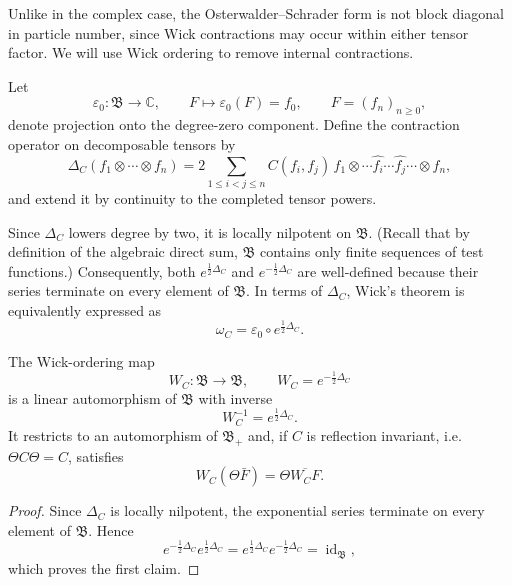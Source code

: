 \documentclass[10pt,a4paper,oneside,reqno]{amsart}
\begin{document}
\begin{appendices}
Unlike in the complex case, the Osterwalder--Schrader form is not block
diagonal in particle number, since Wick contractions may occur within
either tensor factor. We will use Wick ordering to remove internal contractions.

Let
\begin{equation}
  \varepsilon_0:\mathfrak B\longrightarrow\mathbb C,
  \qquad
  F\mapsto \varepsilon_0(F)=f_0,
  \qquad
  F=(f_n)_{n\geq0},
\end{equation}
denote projection onto the degree-zero component. Define the contraction
operator on decomposable tensors by
\begin{equation}
  \Delta_C(f_1\otimes\cdots\otimes f_n)
  =
  2\sum_{1\leq i<j\leq n}
  C(f_i,f_j)\,
  f_1\otimes\cdots
  \widehat{f_i}\cdots
  \widehat{f_j}\cdots
  \otimes f_n,
\end{equation}
and extend it by continuity to the completed tensor powers.

Since $\Delta_C$ lowers degree by two, it is locally nilpotent on
$\mathfrak B$. 
(Recall that by definition of the algebraic direct sum, $\mathfrak B$ contains only finite sequences of test functions.) 
Consequently, both $e^{\frac12\Delta_C}$ and
$e^{-\frac12\Delta_C}$ are well-defined because their series terminate on every
element of $\mathfrak B$. In terms of $\Delta_C$, Wick's theorem is
equivalently expressed as
\begin{equation}
  \omega_C
  =
  \varepsilon_0\circ e^{\frac12\Delta_C}.
\end{equation}

\begin{lemma}
\label{lem:wick-ordering}
The Wick-ordering map
\begin{equation}
  W_C\colon\mathfrak B\longrightarrow\mathfrak B,
  \qquad W_C=e^{-\frac12\Delta_C}
\end{equation}
is a linear automorphism of $\mathfrak B$ with inverse
\begin{equation}
  W_C^{-1}=e^{\frac12\Delta_C}.
\end{equation}
It restricts to an automorphism of $\mathfrak B_+$ and, if $C$ is
reflection invariant, i.e. $\Theta C \Theta =C$,     satisfies
\begin{equation}
  W_C(\Theta\bar F)
  =
  \Theta\overline{W_CF}.
\end{equation}
\end{lemma}

\begin{proof}
Since $\Delta_C$ is locally nilpotent, the exponential series terminate
on every element of $\mathfrak B$. Hence
\begin{equation}
  e^{-\frac12\Delta_C}e^{\frac12\Delta_C}
  =
  e^{\frac12\Delta_C}e^{-\frac12\Delta_C}
  =
  \operatorname{id}_{\mathfrak B},
\end{equation}
which proves the first claim.


\end{proof}
\end{appendices}
\end{document}

